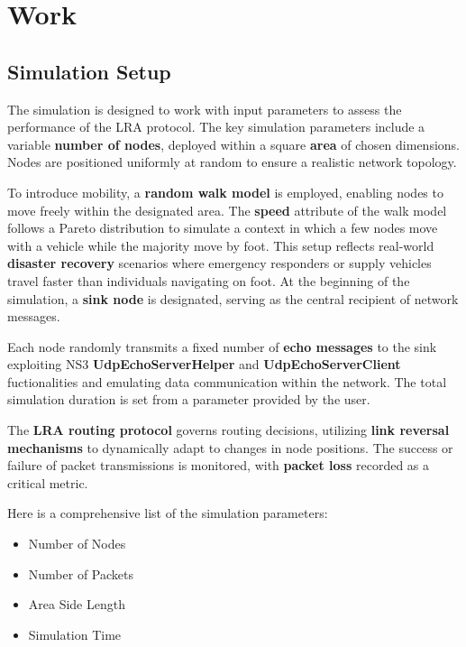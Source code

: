 \documentclass[../report.tex]{subfiles}
\begin{document}
\section{Work}

\subsection{Simulation Setup}
The simulation is designed to work with input parameters to assess the performance of the LRA protocol. The key simulation parameters include a variable \textbf{number of nodes}, deployed within a square \textbf{area} of chosen dimensions. Nodes are positioned uniformly at random to ensure a realistic network topology.

To introduce mobility, a \textbf{random walk model} is employed, enabling nodes to move freely within the designated area. The \textbf{speed} attribute of the walk model follows a Pareto distribution to simulate a context in which a few nodes move with a vehicle while the majority move by foot. This setup reflects real-world \textbf{disaster recovery} scenarios where emergency responders or supply vehicles travel faster than individuals navigating on foot.
At the beginning of the simulation, a \textbf{sink node} is designated, serving as the central recipient of network messages.

Each node randomly transmits a fixed number of \textbf{echo messages} to the sink exploiting NS3 \textbf{UdpEchoServerHelper} and \textbf{UdpEchoServerClient} fuctionalities and emulating data communication within the network. The total simulation duration is set from a parameter provided by the user.

The \textbf{LRA routing protocol} governs routing decisions, utilizing \textbf{link reversal mechanisms} to dynamically adapt to changes in node positions. The success or failure of packet transmissions is monitored, with \textbf{packet loss} recorded as a critical metric.

Here is a comprehensive list of the simulation parameters:
\begin{itemize}
    \item Number of Nodes
    \item Number of Packets
    \item Area Side Length
    \item Simulation Time
\end{itemize}
\end{document}
